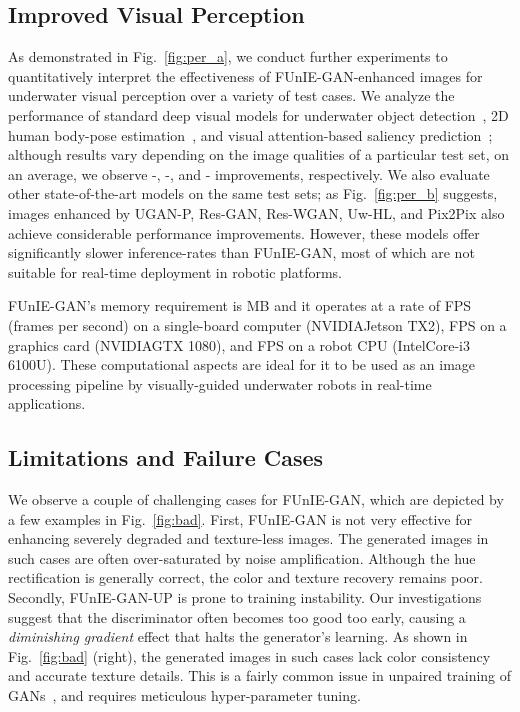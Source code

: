 \documentclass[10pt,twocolumn,letterpaper]{article}
\begin{document}
\subsection{Improved Visual Perception}
As demonstrated in Fig.~\ref{fig:per_a}, we conduct further experiments to quantitatively interpret the effectiveness of FUnIE-GAN-enhanced images for underwater visual perception over a variety of test cases. We analyze the performance of standard deep visual models for underwater object detection~\cite{islam2018towards}, 2D human body-pose estimation~\cite{cao2017realtime}, and visual attention-based saliency prediction~\cite{wang2018salient}; although results vary depending on the image qualities of a particular test set, on an average, we observe -, -, and - improvements, respectively. We also evaluate other state-of-the-art models on the same test sets; as Fig.~\ref{fig:per_b} suggests, images enhanced by UGAN-P, Res-GAN, Res-WGAN, Uw-HL, and Pix2Pix also achieve considerable performance improvements. However, these models offer significantly slower inference-rates than FUnIE-GAN, most of which are not suitable for real-time deployment in robotic platforms. 

FUnIE-GAN's memory requirement is  MB and it operates at a rate of  FPS (frames per second) on a single-board computer (NVIDIA\texttrademark Jetson TX2),  FPS on a graphics card (NVIDIA\texttrademark GTX 1080), and  FPS on a robot CPU (Intel\texttrademark Core-i3 6100U). 
These computational aspects are ideal for it to be used as an image processing pipeline by visually-guided underwater robots in real-time applications. 



    





\subsection{Limitations and Failure Cases}\label{limit}
We observe a couple of challenging cases for FUnIE-GAN, which are depicted by a few examples in Fig.~\ref{fig:bad}. First, FUnIE-GAN is not very effective for enhancing severely degraded and texture-less images. The generated images in such cases are often over-saturated by noise amplification. Although the hue rectification is generally correct, the color and texture recovery remains poor. Secondly, FUnIE-GAN-UP is prone to training instability. Our investigations suggest that the discriminator often becomes too good too early, causing a \textit{diminishing gradient} effect that halts the generator's learning. As shown in Fig.~\ref{fig:bad} (right), the generated images in such cases lack color consistency and accurate texture details. This is a fairly common issue in unpaired training of GANs~\cite{chen2018deep,ignatov2017dslr,johnson2016perceptual}, and requires meticulous hyper-parameter tuning.     
\end{document}
